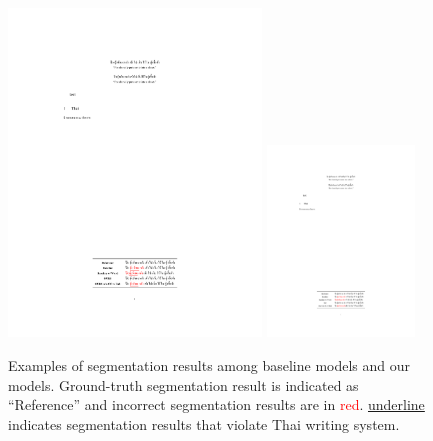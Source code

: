 \begin{figure}
    \centering
    \includegraphics[width=0.6\textwidth]{figures/fig-case-study.pdf}
    \hspace{\textwidth}
    \includegraphics[width=0.35\textwidth]{figures/fig-case-study-tran.pdf}
    \caption{Examples of segmentation results among baseline models and our models. Ground-truth segmentation result is indicated as ``Reference'' and incorrect segmentation results are in \textcolor{red}{red}. \underline{underline} indicates segmentation results that violate Thai writing system.}
    \label{fig:case-study}
\end{figure}